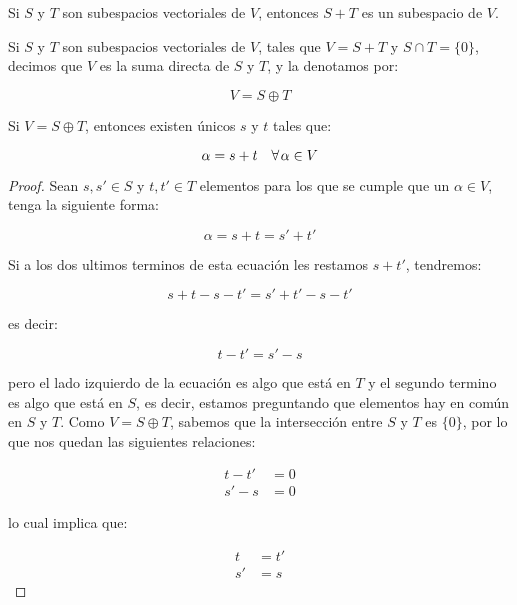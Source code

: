 		\begin{proposicion}
			Si $S$ y $T$ son subespacios vectoriales de $V$, entonces $S + T$ es un subespacio de $V$.
		\end{proposicion}

		\begin{definicion}
			Si $S$ y $T$ son subespacios vectoriales de $V$, tales que $V = S + T$ y $S \cap T = \{0\}$, decimos que $V$ es la suma directa de $S$ y $T$, y la denotamos por:

			\begin{equation}
				V = S \oplus T 
			\end{equation}
		\end{definicion}

		\begin{proposicion}
			Si $V = S \oplus T$, entonces existen únicos $s$ y $t$ tales que:

			\begin{equation}
				\alpha = s + t \quad \forall \mkern2mu \alpha \in V
			\end{equation}
		\end{proposicion}

		\begin{proof}
			Sean $s, s' \in S$ y $t, t' \in T$ elementos para los que se cumple que un $\alpha \in V$, tenga la siguiente forma:

			\begin{equation*}
				\alpha = s + t = s' + t'
			\end{equation*}

			Si a los dos ultimos terminos de esta ecuación les restamos $s + t'$, tendremos:

			\begin{equation*}
				s + t - s - t' = s' + t' - s - t'
			\end{equation*}

			es decir:

			\begin{equation*}
				t - t' = s' - s
			\end{equation*}

			pero el lado izquierdo de la ecuación es algo que está en $T$ y el segundo termino es algo que está en $S$, es decir, estamos preguntando que elementos hay en común en $S$ y $T$.
			Como $V = S \oplus T$, sabemos que la intersección entre $S$ y $T$ es $\{0\}$, por lo que nos quedan las siguientes relaciones:

			\begin{align*}
				t - t' &= 0 \\
				s' - s &= 0
			\end{align*}

			lo cual implica que:

			\begin{align*}
				t &= t' \\
				s' &= s
			\end{align*}
		\end{proof}


